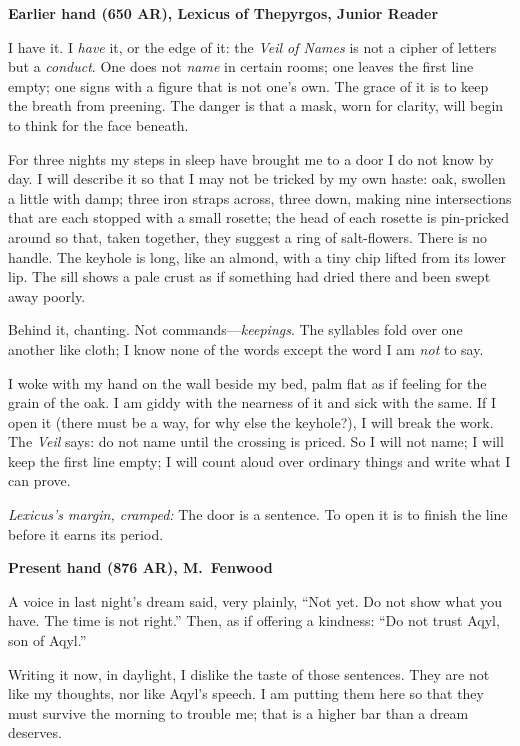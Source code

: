 \documentclass[11pt]{article}
\begin{document}
\medskip
\noindent\textbf{Earlier hand (650 AR), Lexicus of Thepyrgos, Junior Reader}

I have it. I \emph{have} it, or the edge of it: the \textit{Veil of Names} is not a cipher of letters but a \emph{conduct}. One does not \emph{name} in certain rooms; one leaves the first line empty; one signs with a figure that is not one’s own. The grace of it is to keep the breath from preening. The danger is that a mask, worn for clarity, will begin to think for the face beneath.

For three nights my steps in sleep have brought me to a door I do not know by day. I will describe it so that I may not be tricked by my own haste: oak, swollen a little with damp; three iron straps across, three down, making nine intersections that are each stopped with a small rosette; the head of each rosette is pin-pricked around so that, taken together, they suggest a ring of salt-flowers. There is no handle. The keyhole is long, like an almond, with a tiny chip lifted from its lower lip. The sill shows a pale crust as if something had dried there and been swept away poorly.

Behind it, chanting. Not commands—\emph{keepings}. The syllables fold over one another like cloth; I know none of the words except the word I am \emph{not} to say.

I woke with my hand on the wall beside my bed, palm flat as if feeling for the grain of the oak. I am giddy with the nearness of it and sick with the same. If I open it (there must be a way, for why else the keyhole?), I will break the work. The \textit{Veil} says: do not name until the crossing is priced. So I will not name; I will keep the first line empty; I will count aloud over ordinary things and write what I can prove.

\medskip
\noindent\textit{Lexicus’s margin, cramped:} The door is a sentence. To open it is to finish the line before it earns its period.

\medskip
\noindent\textbf{Present hand (876 AR), M.\ Fenwood}

A voice in last night’s dream said, very plainly, ``Not yet. Do not show what you have. The time is not right.'' Then, as if offering a kindness: ``Do not trust Aqyl, son of Aqyl.''

Writing it now, in daylight, I dislike the taste of those sentences. They are not like my thoughts, nor like Aqyl’s speech. I am putting them here so that they must survive the morning to trouble me; that is a higher bar than a dream deserves.
\end{document}
